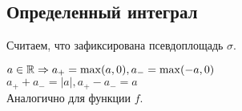  \newpage

\subsection{Определенный интеграл}

Считаем, что зафиксирована псевдоплощадь $\sigma$.


\begin{definition}
    $a \in \R \Rightarrow a_+ = \max(a, 0), a_- = \max(-a, 0)$ \\
    $a_+ + a_- = |a|, a_+ - a_- = a$ \\
    Аналогично для функции $f$. \\





    \begin{tikzpicture}[x=0.75pt,y=0.75pt,yscale=-1,xscale=1]
    

\end{tikzpicture}
\end{definition}
